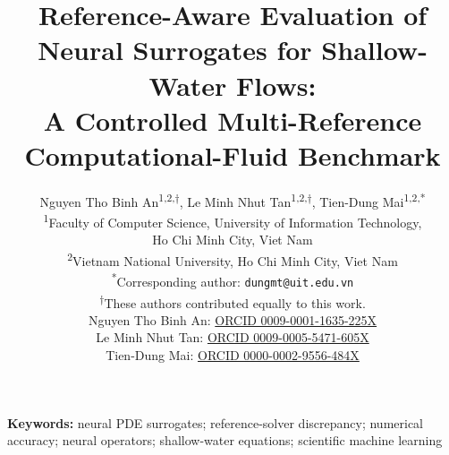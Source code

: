 \documentclass[11pt,a4paper,fleqn]{article}
\title{Reference-Aware Evaluation of Neural Surrogates for Shallow-Water Flows:\\
A Controlled Multi-Reference Computational-Fluid Benchmark}
\author{%
Nguyen Tho Binh An\textsuperscript{1,2,$\dagger$},
Le Minh Nhut Tan\textsuperscript{1,2,$\dagger$},
Tien-Dung Mai\textsuperscript{1,2,*}\\[0.6em]
\small \textsuperscript{1}Faculty of Computer Science,
University of Information Technology,\\
\small Ho Chi Minh City, Viet Nam\\
\small \textsuperscript{2}Vietnam National University,
Ho Chi Minh City, Viet Nam\\[0.4em]
\small \textsuperscript{*}Corresponding author:
\texttt{dungmt@uit.edu.vn}\\
\small \textsuperscript{$\dagger$}These authors contributed equally to this work.\\
\small Nguyen Tho Binh An:
\href{https://orcid.org/0009-0001-1635-225X}{ORCID 0009-0001-1635-225X}\\
\small Le Minh Nhut Tan:
\href{https://orcid.org/0009-0005-5471-605X}{ORCID 0009-0005-5471-605X}\\
\small Tien-Dung Mai:
\href{https://orcid.org/0000-0002-9556-484X}{ORCID 0000-0002-9556-484X}}
\date{}
\begin{document}
\maketitle



\noindent\textbf{Keywords:}
neural PDE surrogates;
reference-solver discrepancy;
numerical accuracy;
neural operators;
shallow-water equations;
scientific machine learning














\appendix


\clearpage



\end{document}
